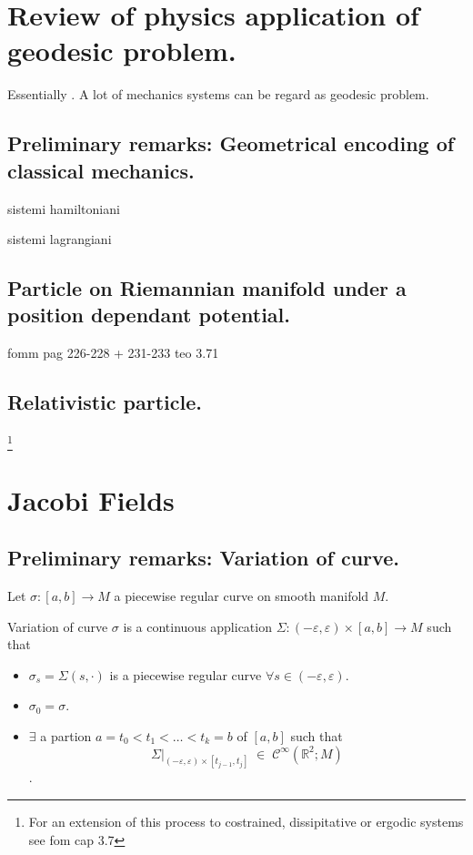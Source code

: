 \documentclass[a4paper,12pt]{scrartcl}    %
\begin{document}
\newpage
\section{Review of physics application of geodesic problem.}
Essentially \cite{Abraham1978}.
\vspace{6mm}
A lot of mechanics systems can be regard as geodesic problem.

\subsection{Preliminary remarks: Geometrical encoding of classical mechanics.}
    sistemi hamiltoniani

    sistemi lagrangiani
    
\subsection{Particle on Riemannian manifold under a position dependant potential.}	
	fomm pag 226-228 + 231-233       teo 3.71
 
    
    
\subsection{Relativistic particle.}


	\footnote{For an extension of this process to costrained, dissipitative or ergodic systems see fom cap 3.7}


\newpage
\section{Jacobi Fields}

\subsection{Preliminary remarks: Variation of curve.}
Let $\sigma:[a,b]\rightarrow M$ a piecewise regular curve on smooth manifold $M$.

 \begin{definition}
  Variation of curve $\sigma$ is a continuous application $\Sigma: (-\varepsilon, \varepsilon) \times [a,b] \rightarrow M$ such that
  \begin{itemize}
   \item $\sigma_s = \Sigma(s, \cdot)$ is a piecewise regular curve $\forall s \in  (-\varepsilon, \varepsilon)$.
   \item $\sigma_0 = \sigma$.
   \item $\exists$ a partion $ a= t_0 < t_1 < \ldots < t_k=b$ of $[a,b]$ such that 
   $$ \Sigma \big \vert_{(-\varepsilon, \varepsilon) \times [t_{j-1},t_{j}]}\; \in \; \mathcal{C}^\infty(\mathbb{R}^2; M)$$.
  \end{itemize}
 \end{definition}
 
\end{document}
